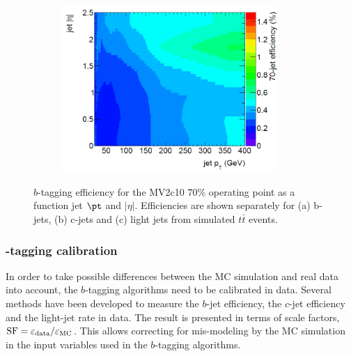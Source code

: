 \begin{figure}[h!]
\begin{center}
\begin{subfigure}{0.5\textwidth}
  \includegraphics[width=0.9\textwidth]{figures/Objects/Eff_Light.png}
  \caption{}
  \label{sec:obj:fig:leff}
\end{subfigure}
\end{center}
\captionsetup{width=0.85\textwidth} \caption{\small $b$-tagging efficiency for the MV2c10 $70\%$ operating point as a function jet $\pt$ and $|\eta|$. Efficiencies are shown separately for (a) b-jets, (b) c-jets and (c) light jets from simulated $t\bar{t}$ events.}
\label{sec:obj:fig:btageff}
\end{figure}




\subsubsection[$b$-tagging calibration]{-tagging calibration}
In order to take possible differences between the MC simulation and real data into account, the $b$-tagging algorithms need to be calibrated in data. Several methods have been developed to measure the $b$-jet efficiency, the $c$-jet efficiency and the light-jet rate in data. The result is presented in terms of scale factors, ${\rm SF}= \epsilon_{\rm data}/\epsilon_{\rm MC} $. This allows correcting for mis-modeling by the MC simulation in the input variables used in the $b$-tagging algorithms.

